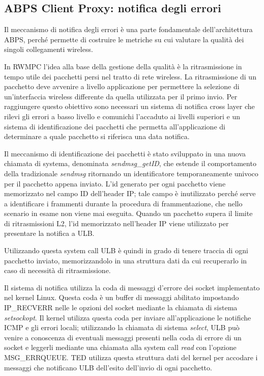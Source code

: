 \documentclass[12pt,a4paper,openright,twoside]{book}
\begin{document}
\subsection{ABPS Client Proxy: notifica degli errori}

Il meccanismo di notifica degli errori è una parte fondamentale
dell'architettura ABPS, perché permette di costruire le metriche su
cui valutare la qualità dei singoli collegamenti wireless.

In RWMPC l'idea alla base della gestione della qualità è la
ritrasmissione in tempo utile dei pacchetti persi nel tratto di rete
wireless. La ritrasmissione di un pacchetto deve avvenire a livello
applicazione per permettere la selezione di un'interfaccia wireless
differente da quella utilizzata per il primo invio. Per raggiungere
questo obiettivo sono necessari un sistema di notifica cross layer che
rilevi gli errori a basso livello e comunichi l'accaduto ai livelli
superiori e un sistema di identificazione dei pacchetti che permetta
all'applicazione di determinare a quale pacchetto si riferisca una
data notifica.

Il meccanismo di identificazione dei pacchetti è stato sviluppato in
una nuova chiamata di systema, denominata \emph{sendmsg\_getID}, che
estende il comportamento della tradizionale \emph{sendmsg} ritornando
un identificatore temporaneamente univoco per il pacchetto appena
inviato. L'id generato per ogni pacchetto viene memorizzato nel campo
ID dell'header IP; tale campo è inutilizzato perché serve a
identificare i frammenti durante la procedura di frammentazione, che
nello scenario in esame non viene mai eseguita. Quando un pacchetto
supera il limite di ritrasmissioni L2, l'id memorizzato nell'header IP
viene utilizzato per presentare la notifica a ULB.

Utilizzando questa system call ULB è quindi in grado di
tenere traccia di ogni pacchetto inviato, memorizzandolo in una
struttura dati da cui recuperarlo in caso di necessità di
ritrasmissione.

Il sistema di notifica utilizza la coda di messaggi d'errore dei
socket implementato nel kernel Linux. Questa coda è un buffer di
messaggi abilitato impostando IP\_RECVERR nelle le opzioni del socket
mediante la chiamata di sistema \emph{setsockopt}. Il kernel utilizza
questa coda per inviare all'applicazione le notifiche ICMP e gli
errori locali; utilizzando la chiamata di sistema \emph{select}, ULB
può venire a conoscenza di eventuali messaggi presenti nella coda di
errore di un socket e leggerli mediante una chiamata alla system call
\emph{read} con l'opzione MSG\_ERRQUEUE. TED utilizza questa struttura
dati del kernel per accodare i messaggi che notificano ULB dell'esito
dell'invio di ogni pacchetto.
\end{document}
